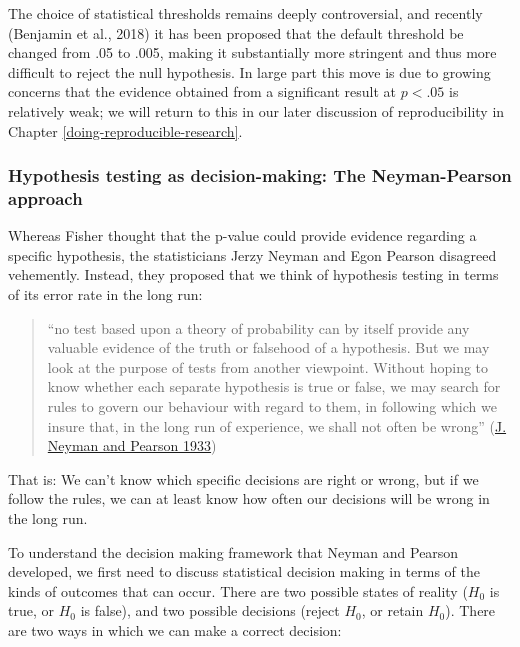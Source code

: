 \documentclass[
  12pt,
]{book}
\begin{document}
The choice of statistical thresholds remains deeply controversial, and recently (Benjamin et al., 2018) it has been proposed that the default threshold be changed from .05 to .005, making it substantially more stringent and thus more difficult to reject the null hypothesis. In large part this move is due to growing concerns that the evidence obtained from a significant result at \(p < .05\) is relatively weak; we will return to this in our later discussion of reproducibility in Chapter \ref{doing-reproducible-research}.

\hypertarget{hypothesis-testing-as-decision-making-the-neyman-pearson-approach}{%
\subsubsection{Hypothesis testing as decision-making: The Neyman-Pearson approach}\label{hypothesis-testing-as-decision-making-the-neyman-pearson-approach}}

Whereas Fisher thought that the p-value could provide evidence regarding a specific hypothesis, the statisticians Jerzy Neyman and Egon Pearson disagreed vehemently. Instead, they proposed that we think of hypothesis testing in terms of its error rate in the long run:

\begin{quote}
``no test based upon a theory of probability can by itself provide any valuable evidence of the truth or falsehood of a hypothesis. But we may look at the purpose of tests from another viewpoint. Without hoping to know whether each separate hypothesis is true or false, we may search for rules to govern our behaviour with regard to them, in following which we insure that, in the long run of experience, we shall not often be wrong'' (\protect\hyperlink{ref-Neyman289}{J. Neyman and Pearson 1933})
\end{quote}

That is: We can't know which specific decisions are right or wrong, but if we follow the rules, we can at least know how often our decisions will be wrong in the long run.

To understand the decision making framework that Neyman and Pearson developed, we first need to discuss statistical decision making in terms of the kinds of outcomes that can occur. There are two possible states of reality (\(H_0\) is true, or \(H_0\) is false), and two possible decisions (reject \(H_0\), or retain \(H_0\)). There are two ways in which we can make a correct decision:
\end{document}
